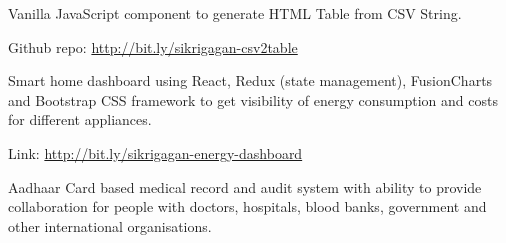 \documentclass[]{gagan-resume}
\begin{document}
\begin{minipage}[t]{0.65\textwidth}

\vspace{\topsep}
\vspace{\topsep}
\vspace{\topsep}
\vspace{\topsep}



\vspace{\topsep}
\begin{tightemize}
\item Vanilla JavaScript component to generate HTML Table from CSV String.
\item Github repo: \href{http://bit.ly/sikrigagan-csv2table}{http://bit.ly/sikrigagan-csv2table}
\end{tightemize}
\sectionsep

\vspace{\topsep}
\begin{tightemize}
\item Smart home dashboard using React, Redux (state management), FusionCharts and Bootstrap CSS framework to get visibility of energy consumption and costs for different appliances.
\item Link: \href{http://bit.ly/sikrigagan-energy-dashboard}{http://bit.ly/sikrigagan-energy-dashboard}
\end{tightemize}
\sectionsep

\vspace{\topsep}
\begin{tightemize}
\item Aadhaar Card based medical record and audit system with ability to provide collaboration for people with doctors, hospitals, blood banks, government and other international organisations.
\end{tightemize}
\sectionsep



\end{minipage}
\end{document}
